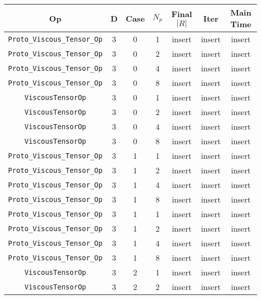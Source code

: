 \documentclass{article}
\begin{document}
\begin{small}
\begin{table}
\begin{center}
\begin{tabular}{|c|c|c|c|c|c||c|} \hline
 Op & D & Case & $N_p$ & Final $|R|$  &  Iter & Main Time \\
\hline 
 {\tt Proto\_Viscous\_Tensor\_Op} & 3 & 0   & 1    &  insert  &  insert    & insert\\
 {\tt Proto\_Viscous\_Tensor\_Op} & 3 & 0   & 2    &  insert  &  insert    & insert\\
 {\tt Proto\_Viscous\_Tensor\_Op} & 3 & 0   & 4    &  insert  &  insert    & insert\\
 {\tt Proto\_Viscous\_Tensor\_Op} & 3 & 0   & 8    &  insert  &  insert    & insert\\
\hline 
 {\tt ViscousTensorOp}            & 3 & 0   & 1    &  insert  &  insert    & insert \\
 {\tt ViscousTensorOp}            & 3 & 0   & 2    &  insert  &  insert    & insert \\
 {\tt ViscousTensorOp}            & 3 & 0   & 4    &  insert  &  insert    & insert \\
 {\tt ViscousTensorOp}            & 3 & 0   & 8    &  insert  &  insert    & insert \\
\hline 
 {\tt Proto\_Viscous\_Tensor\_Op} & 3 & 1   & 1    &  insert  &  insert        & insert\\
 {\tt Proto\_Viscous\_Tensor\_Op} & 3 & 1   & 2    &  insert  &  insert        & insert\\
 {\tt Proto\_Viscous\_Tensor\_Op} & 3 & 1   & 4    &  insert  &  insert        & insert\\
 {\tt Proto\_Viscous\_Tensor\_Op} & 3 & 1   & 8    &  insert  &  insert        & insert\\
\hline 
 {\tt Proto\_Viscous\_Tensor\_Op} & 3 & 1   & 1    &  insert  &  insert        & insert\\
 {\tt Proto\_Viscous\_Tensor\_Op} & 3 & 1   & 2    &  insert  &  insert        & insert\\
 {\tt Proto\_Viscous\_Tensor\_Op} & 3 & 1   & 4    &  insert  &  insert        & insert\\
 {\tt Proto\_Viscous\_Tensor\_Op} & 3 & 1   & 8    &  insert  &  insert        & insert\\
\hline 
 {\tt ViscousTensorOp}            & 3 & 2   & 1    &  insert  &  insert        & insert \\
 {\tt ViscousTensorOp}            & 3 & 2   & 2    &  insert  &  insert        & insert \\

\end{tabular}
\end{center}
\end{table}
\end{small}
\end{document}
